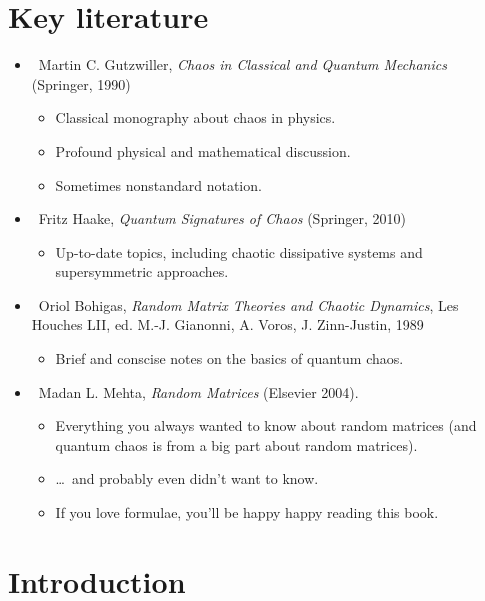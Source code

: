 \documentclass[a4paper,11pt,twoside]{article}
\begin{document}
\section{Key literature}
\begin{itemize}
    \item \cite{Gut90}~Martin C. Gutzwiller, {\it Chaos in Classical and Quantum Mechanics} (Springer, 1990)
        \begin{itemize}
            \item Classical monography about chaos in physics.
            \item Profound physical and mathematical discussion.
            \item Sometimes nonstandard notation.
        \end{itemize}

    \item \cite{Haa10}~Fritz Haake, {\it Quantum Signatures of Chaos} (Springer, 2010)
        \begin{itemize}
            \item Up-to-date topics, including chaotic dissipative systems and supersymmetric approaches.
        \end{itemize}

    \item \cite{Boh89}~Oriol Bohigas, {\it Random Matrix Theories and Chaotic Dynamics}, Les Houches LII, ed. M.-J. Gianonni, A. Voros, J. Zinn-Justin, 1989
        \begin{itemize}
            \item Brief and conscise notes on the basics of quantum chaos.
        \end{itemize}

    \item \cite{Meh04}~Madan L. Mehta, {\it Random Matrices} (Elsevier 2004).
        \begin{itemize}
            \item Everything you always wanted to know about random matrices (and quantum chaos is from a big part about random matrices).
            \item \dots~and probably even didn't want to know.
            \item If you love formulae, you'll be happy happy reading this book.
        \end{itemize}

    \end{itemize}

\section{Introduction}
\end{document}
